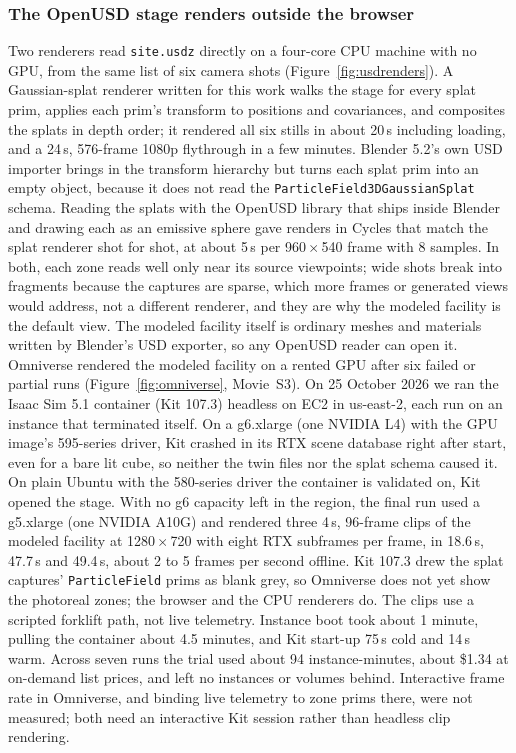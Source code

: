 \documentclass{article}
\newcommand{\code}[1]{\texttt{\small #1}}
\begin{document}
\subsubsection{The OpenUSD stage renders outside the browser}
Two renderers read \code{site.usdz} directly on a four-core CPU machine with
no GPU, from the same list of six camera shots (Figure~\ref{fig:usdrenders}). A
Gaussian-splat renderer written for this work walks the stage for every splat
prim, applies each prim's transform to positions and covariances, and
composites the splats in depth order; it rendered all six stills in about
20\,s including loading, and a 24\,s, 576-frame 1080p flythrough in a few
minutes. Blender 5.2's own USD importer brings in the transform hierarchy but
turns each splat prim into an empty object, because it does not read the
\code{ParticleField3DGaussianSplat} schema. Reading the splats with the OpenUSD
library that ships inside Blender and drawing each as an emissive sphere gave
renders in Cycles that match the splat renderer shot for shot, at about 5\,s
per 960\,$\times$\,540 frame with 8 samples. In both, each zone reads well only
near its source viewpoints; wide shots break into fragments because the
captures are sparse, which more frames or generated views would address, not
a different renderer, and they are why the modeled facility is the default
view. The modeled facility itself is ordinary meshes and materials written by
Blender's USD exporter, so any OpenUSD reader can open it.
Omniverse rendered the modeled facility on a rented GPU after six failed or
partial runs (Figure~\ref{fig:omniverse}, Movie~S3). On 25 October 2026 we ran
the Isaac Sim 5.1 container (Kit 107.3) headless on EC2 in us-east-2, each run
on an instance that terminated itself. On a g6.xlarge (one NVIDIA L4) with the
GPU image's 595-series driver, Kit crashed in its RTX scene database right
after start, even for a bare lit cube, so neither the twin files nor the splat
schema caused it. On plain Ubuntu with the 580-series driver the container is
validated on, Kit opened the stage. With no g6 capacity left in the region, the
final run used a g5.xlarge (one NVIDIA A10G) and rendered three 4\,s,
96-frame clips of the modeled facility at 1280\,$\times$\,720 with eight RTX
subframes per frame, in 18.6\,s, 47.7\,s and 49.4\,s, about 2 to 5 frames
per second offline. Kit 107.3 drew the splat captures' \code{ParticleField}
prims as blank grey, so Omniverse does not yet show the photoreal zones; the
browser and the CPU renderers do. The clips use a scripted forklift path, not
live telemetry. Instance boot took about 1 minute, pulling the container about
4.5 minutes, and Kit start-up 75\,s cold and 14\,s warm. Across seven runs the
trial used about 94 instance-minutes, about \$1.34 at on-demand list prices,
and left no instances or volumes behind. Interactive frame rate in Omniverse, and binding live telemetry to zone
prims there, were not measured; both need an interactive Kit session rather
than headless clip rendering.
\end{document}

